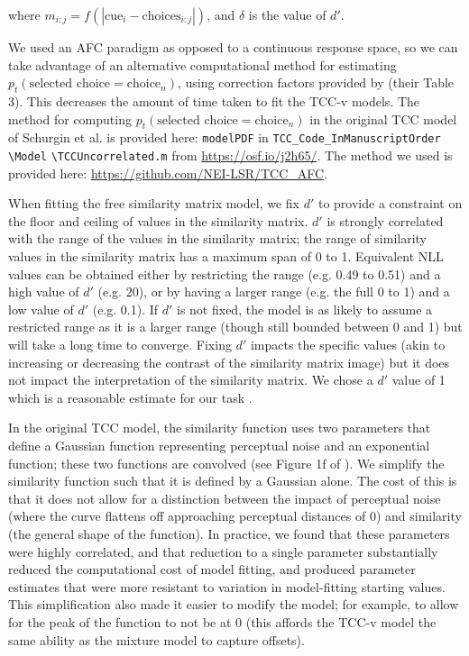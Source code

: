 \documentclass[9pt,biorxiv,lineno,onehalfspacing]{lapreprint}
\begin{document}
\begin{refsection}
where $m_{i:j} = f\left(|\text{cue}_{i} - \text{choices}_{i:j}|\right)$, and $\delta$ is the value of $d'$.

We used an AFC paradigm as opposed to a continuous response space, so we can take advantage of an alternative computational method for estimating $p_t(\text{selected choice} = \text{choice}_n)$, using correction factors provided by \citet{mcgraw_common_1992} (their Table 3). 
This decreases the amount of time taken to fit the TCC-v models. 
The method for computing $p_t(\text{selected choice} = \text{choice}_n)$ in the original TCC model of Schurgin et al. is provided here: \verb|modelPDF| in \verb|TCC_Code_InManuscriptOrder |\verb|\Model| \verb|\TCCUncorrelated.m| from \url{https://osf.io/j2h65/}. 
The method we used is provided here: \url{https://github.com/NEI-LSR/TCC_AFC}.

When fitting the free similarity matrix model, we fix $d'$ to provide a constraint on the floor and ceiling of values in the similarity matrix.
$d'$ is strongly correlated with the range of the values in the similarity matrix; the range of similarity values in the similarity matrix has a maximum span of 0 to 1. 
Equivalent NLL values can be obtained either by restricting the range (e.g. 0.49 to 0.51) and a high value of $d'$ (e.g. 20), or by having a larger range (e.g. the full 0 to 1) and a low value of $d'$ (e.g. 0.1). 
If $d'$ is not fixed, the model is as likely to assume a restricted range as it is a larger range (though still bounded between 0 and 1) but will take a long time to converge. 
Fixing $d'$ impacts the specific values (akin to increasing or decreasing the contrast of the similarity matrix image) but it does not impact the interpretation of the similarity matrix. 
We chose a $d'$ value of 1 which is a reasonable estimate for our task \citep{schurgin_psychophysical_2020}.

In the original TCC model, the similarity function uses two parameters that define a Gaussian function representing perceptual noise and an exponential function; these two functions are convolved (see Figure 1f of \citep{schurgin_psychophysical_2020}). 
We simplify the similarity function such that it is defined by a Gaussian alone. 
The cost of this is that it does not allow for a distinction between the impact of perceptual noise (where the curve flattens off approaching perceptual distances of 0) and similarity (the general shape of the function). 
In practice, we found that these parameters were highly correlated, and that reduction to a single parameter substantially reduced the computational cost of model fitting, and produced parameter estimates that were more resistant to variation in model-fitting starting values. 
This simplification also made it easier to modify the model; for example, to allow for the peak of the function to not be at 0 (this affords the TCC-v model the same ability as the mixture model to capture offsets).


\end{refsection}
\end{document}
